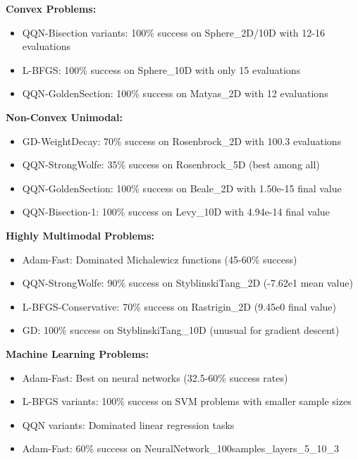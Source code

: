 \textbf{Convex Problems:}

\begin{itemize}
\tightlist
\item
  QQN-Bisection variants: 100\% success on Sphere\_2D/10D with 12-16 evaluations
\item
  L-BFGS: 100\% success on Sphere\_10D with only 15 evaluations
\item
  QQN-GoldenSection: 100\% success on Matyas\_2D with 12 evaluations
\end{itemize}

\textbf{Non-Convex Unimodal:}

\begin{itemize}
\tightlist
\item
  GD-WeightDecay: 70\% success on Rosenbrock\_2D with 100.3 evaluations
\item
  QQN-StrongWolfe: 35\% success on Rosenbrock\_5D (best among all)
\item
  QQN-GoldenSection: 100\% success on Beale\_2D with 1.50e-15 final value
\item
  QQN-Bisection-1: 100\% success on Levy\_10D with 4.94e-14 final value
\end{itemize}

\textbf{Highly Multimodal Problems:}

\begin{itemize}
\tightlist
\item
  Adam-Fast: Dominated Michalewicz functions (45-60\% success)
\item
  QQN-StrongWolfe: 90\% success on StyblinskiTang\_2D (-7.62e1 mean value)
\item
  L-BFGS-Conservative: 70\% success on Rastrigin\_2D (9.45e0 final value)
\item
  GD: 100\% success on StyblinskiTang\_10D (unusual for gradient descent)
\end{itemize}

\textbf{Machine Learning Problems:}

\begin{itemize}
\tightlist
\item
  Adam-Fast: Best on neural networks (32.5-60\% success rates)
\item
  L-BFGS variants: 100\% success on SVM problems with smaller sample sizes
\item
  QQN variants: Dominated linear regression tasks
\item
  Adam-Fast: 60\% success on NeuralNetwork\_100samples\_layers\_5\_10\_3
\end{itemize}

